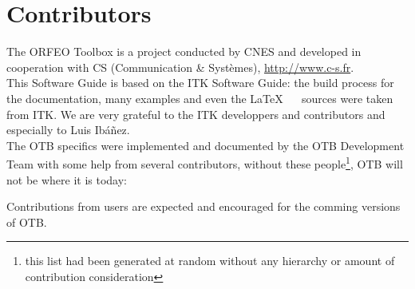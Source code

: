 \chapter{Contributors}
\noindent

The ORFEO Toolbox is a project conducted by CNES and developed in
cooperation with CS (Communication \& Syst\`{e}mes), \url{http://www.c-s.fr}.\\

This Software Guide is based on the ITK Software Guide: the build
process for the documentation, many examples and even the \LaTeX~ ~
sources were taken from ITK. We are very grateful to the ITK
developpers and contributors and especially to Luis Ib\'a\~nez.\\

The OTB specifics were implemented and documented by the OTB Development Team with some help from several contributors, without these people\footnote{this list had been generated at random without any hierarchy or amount of contribution consideration}, OTB will not be where it is today:



Contributions from users are expected and encouraged for the comming
versions of OTB.

